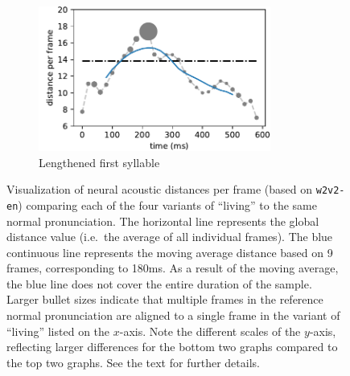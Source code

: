 \documentclass[11pt,a4paper]{article}
\begin{document}
\begin{figure}[ht]
\begin{subfigure}[b]{0.49\textwidth}
         \centering
         \includegraphics[width=3in]{figures/vis-tool/living_ref2li_ving7_v2.pdf}
         \caption{Lengthened first syllable}
         \label{fig:vistool-lengthened}
     \end{subfigure}
     \caption{Visualization of neural acoustic distances per frame (based on \texttt{w2v2-en}) comparing each of the four variants of ``living'' to the same normal pronunciation. The horizontal line represents the global distance value (i.e.~the average of all individual frames). The blue continuous line represents the moving average distance based on 9 frames, corresponding to 180ms. As a result of the moving average, the blue line does not cover the entire duration of the sample. Larger bullet sizes indicate that multiple frames in the reference normal pronunciation are aligned to a single frame in the variant of ``living'' listed on the $x$-axis. Note the different scales of the $y$-axis, reflecting larger differences for the bottom two graphs compared to the top two graphs. See the text for further details.}
     \label{fig:fourplots}
\end{figure}


\end{document}
